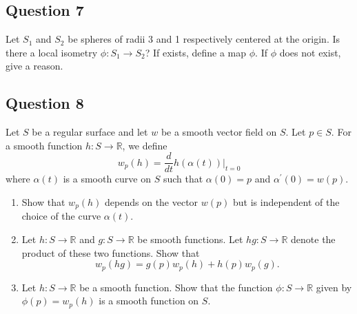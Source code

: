 \documentclass[12pt, a4paper]{article}
\newcommand{\R}{\mathbb{R}}
\begin{document}
\subsection*{Question 7}
Let $S_{1}$ and $S_{2}$ be spheres of radii 3 and 1 respectively centered at the origin. Is there a local isometry $\phi:S_{1}\rightarrow S_{2}$? If exists, define a map $\phi$. If $\phi$ does not exist, give a reason.
\newpage

\subsection*{Question 8}
Let $S$ be a regular surface and let $w$ be a smooth vector field on $S$. Let $p\in S$. For a smooth function $h:S\rightarrow\R$, we define
\[ w_{p}(h)=\frac{d}{dt}h(\alpha(t))|_{t=0} \]
where $\alpha(t)$ is a smooth curve on $S$ such that $\alpha(0)=p$ and $\alpha^{\prime}(0)=w(p)$.
\begin{enumerate}[label=(\roman*)]
    \item Show that $w_{p}(h)$ depends on the vector $w(p)$ but is independent of the choice of the curve $\alpha(t)$.
    \item Let $h:S\rightarrow\R$ and $g:S\rightarrow\R$ be smooth functions. Let $hg:S\rightarrow\R$ denote the product of these two functions. Show that
    \[ w_{p}(hg)=g(p)w_{p}(h)+h(p)w_{p}(g). \]
    \item Let $h:S\rightarrow\R$ be a smooth function. Show that the function $\phi:S\rightarrow\R$ given by $\phi(p)=w_{p}(h)$ is a smooth function on $S$.
\end{enumerate}
\newpage
\end{document}
